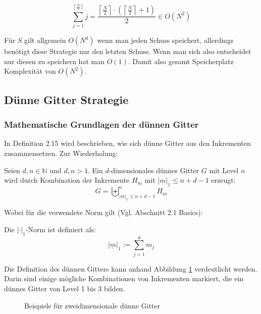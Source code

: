 \documentclass[a4paper,12pt]{llncs}
\numberwithin{equation}{section}
\begin{document}
\begin{equation}
\sum_{j=1}^{\left\lceil\frac{N}{2}\right\rceil}j=\frac{\left\lceil\frac{N}{2}\right\rceil\cdot\left(\left\lceil\frac{N}{2}\right\rceil+1\right)}{2}\in O\left(N^2\right)
\end{equation}


Für $S$ gilt allgemein $O(N^d)$ wenn man jeden Schuss speichert, allerdings benötigt diese Strategie nur den letzten Schuss. Wenn man sich also entscheidet nur diesen zu speichern hat man $O(1)$. Damit also gesamt Speicherplatz Komplexität von $O(N^2)$.


\subsection{Dünne Gitter Strategie}

\subsubsection{Mathematische Grundlagen der dünnen Gitter}

In \cite{M13} Definition 2.15 wird beschrieben, wie sich dünne Gitter aus den Inkrementen zusammensetzen. Zur Wiederholung:

\begin{definition}
	Seien $d,n\in\mathbb{N}$ und $d,n>1$. Ein $d$-dimensionales dünnes Gitter $G$ mit Level $n$ wird durch Kombination der Inkremente $H_{\underline{m}}$ mit $|\underline{m}|_1\leq n+d-1$ erzeugt:
	\begin{equation}
	G=\biguplus_{|\underline{m}|_1\leq n+d-1}^n H_{\underline{m}}
	\end{equation}
\end{definition}

Wobei für die verwendete Norm gilt (Vgl. \cite{P10} Abschnitt 2.1 Basics):

\begin{definition}
Die  $|\cdot|_1$-Norm ist definiert als:
	\begin{equation}
	|\underline{m}|_1:=\sum_{j=1}^d m_j
	\end{equation}
\end{definition}


Die Definition des dünnen Gitters kann anhand Abbildung \ref{fig:gitter03} verdeutlicht werden. Darin sind einige mögliche Kombinationen von Inkrementen markiert, die ein dünnes Gitter von Level 1 bis 3 bilden.

\begin{figure}
	\caption{Beispiele für zweidimensionale dünne Gitter}
	\label{fig:gitter03}
\end{figure}
\end{document}
